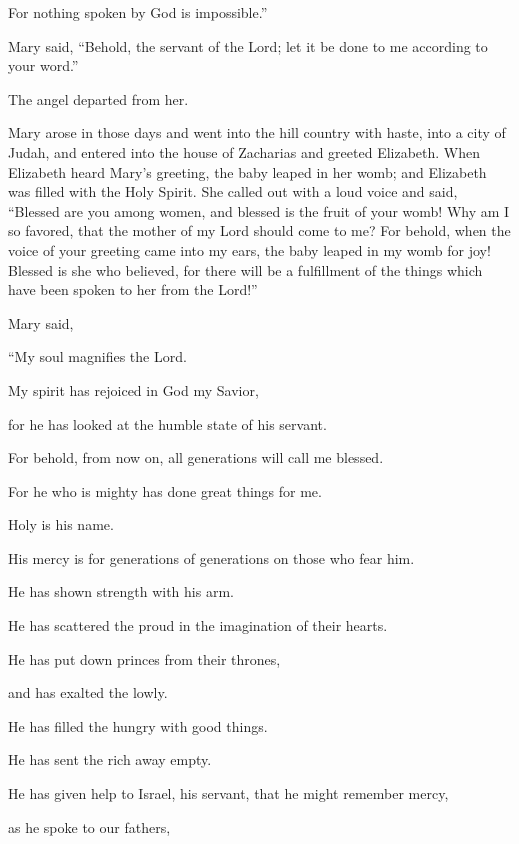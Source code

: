 {For nothing spoken by God is impossible.”
\par }{\PP {}Mary said, “Behold, the servant of the Lord; let it be done to me according to your word.”
\par }{\PP The angel departed from her.
\par }{\PP {}Mary arose in those days and went into the hill country with haste, into a city of Judah,
and entered into the house of Zacharias and greeted Elizabeth.
When Elizabeth heard Mary’s greeting, the baby leaped in her womb; and Elizabeth was filled with the Holy Spirit.
She called out with a loud voice and said, “Blessed are you among women, and blessed is the fruit of your womb!
Why am I so favored, that the mother of my Lord should come to me?
For behold, when the voice of your greeting came into my ears, the baby leaped in my womb for joy!
Blessed is she who believed, for there will be a fulfillment of the things which have been spoken to her from the Lord!”
\par }{\PP {}Mary said,
\par }{\Q “My soul magnifies the Lord.
\par }{\QB {}My spirit has rejoiced in God my Savior,
\par }{\QB {}for he has looked at the humble state of his servant.
\par }{\Q For behold, from now on, all generations will call me blessed.
\par }{\QB {}For he who is mighty has done great things for me.
\par }{\QB Holy is his name.
\par }{\QB {}His mercy is for generations of generations on those who fear him.
\par }{\Q {}He has shown strength with his arm.
\par }{\QB He has scattered the proud in the imagination of their hearts.
\par }{\Q {}He has put down princes from their thrones,
\par }{\QB and has exalted the lowly.
\par }{\Q {}He has filled the hungry with good things.
\par }{\QB He has sent the rich away empty.
\par }{\Q {}He has given help to Israel, his servant, that he might remember mercy,
\par }{\QB {}as he spoke to our fathers,
}
